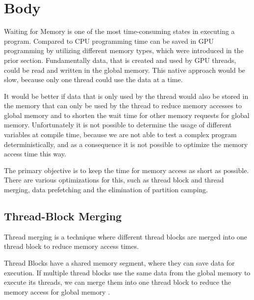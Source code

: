 \documentclass[conference]{IEEEtran}
\begin{document}
		
		
		


\section{Body}

	Waiting for Memory is one of the most time-consuming states in executing a program. Compared to CPU programming time can be saved in GPU programming by utilizing different memory types, which were introduced in the prior section. Fundamentally data, that is created and used by GPU threads, could be read and written in the global memory. This native approach would be slow, because only one thread could use the data at a time.
	
	It would be better if data that is only used by the thread would also be stored in the memory that can only be used by the thread to reduce memory accesses to global memory and to shorten the wait time for other memory requests for global memory.
	Unfortunately it is not possible to determine the usage of different variables at compile time, because we are not able to test a complex program deterministically, and as a consequence it is not possible to optimize the memory access time this way.

	The primary objective is to keep the time for memory access as short as possible. There are various optimizations for this, such as thread block and thread merging, data prefetching and the elimination of partition camping.
	

	
	\subsection{Thread-Block Merging}
	
	
	Thread merging is a technique where different thread blocks are merged into one thread block to reduce memory access times.
	
	
	Thread Blocks have a shared memory segment, where they can save data for execution. If multiple thread blocks use the same data from the global memory to execute its threads, we can merge them into one thread block to reduce the memory access for global memory \cite{GPGPUCompiler}.
	
\end{document}
